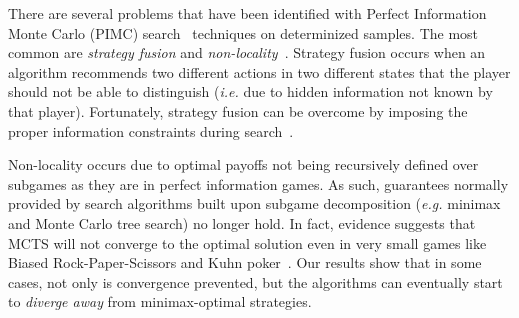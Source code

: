 \documentclass[letterpaper]{article}
\newcommand{\ie}{{\it i.e.}\xspace}
\newcommand{\eg}{{\it e.g.}\xspace}
\begin{document}

There are several problems that have been identified with Perfect Information Monte Carlo
(PIMC) search~\cite{Long10Understanding} techniques
on determinized samples. The most common are {\it strategy fusion} and {\it non-locality}~\cite{Frank98Finding}.
Strategy fusion occurs when an algorithm recommends two different actions in two different states that the player should
not be able to distinguish (\ie due to hidden information not known by that player).
Fortunately, strategy fusion can be overcome by imposing the proper information constraints during 
search~\cite{Frank98Finding,Ciancarini10Kriegspiel,Ponsen11Computing,Lisy12peg,Cowling12ISMCTS}. 

Non-locality occurs due to optimal payoffs not being recursively defined over subgames as they are 
in perfect information games. As such, guarantees normally provided by search algorithms built upon 
subgame decomposition (\eg minimax and Monte Carlo tree search) no longer hold. 
In fact, evidence suggests that MCTS will not converge to the optimal solution even in very
small games like Biased Rock-Paper-Scissors and Kuhn poker~\cite{Shafiei09,Ponsen11Computing}.
Our results show that in some cases, not only is convergence prevented, but the algorithms can eventually start to  
{\it diverge away} from minimax-optimal strategies.



\end{document}
